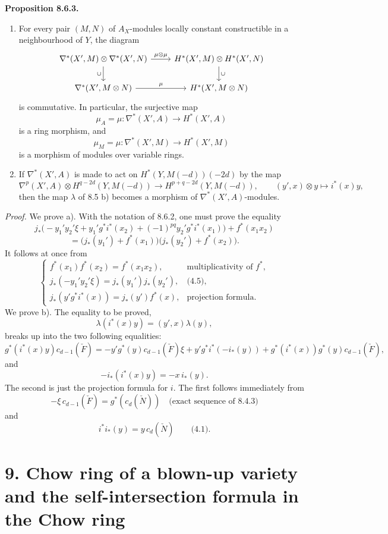 \documentclass[11pt]{article}
\newenvironment{statement}[1]{\par\medskip\noindent\textbf{#1.}\ }{\par\medskip}
\begin{document}
\begin{statement}{Proposition 8.6.3}
\begin{enumerate}[label=\alph*)]
\item For every pair $(M,N)$ of $A_X$-modules locally constant constructible in a neighbourhood of $Y$, the diagram
\[
\begin{tikzcd}
\nabla^*(X',M)\otimes\nabla^*(X',N)\arrow[r,"\mu\otimes\mu"]\arrow[d,"\cup"']&
H^*(X',M)\otimes H^*(X',N)\arrow[d,"\cup"]\\
\nabla^*(X',M\otimes N)\arrow[r,"\mu"]&
H^*(X',M\otimes N)
\end{tikzcd}
\]
is commutative. In particular, the surjective map
\[
\mu_A=\mu:\nabla^*(X',A)\to H^*(X',A)
\]
is a ring morphism, and
\[
\mu_M=\mu:\nabla^*(X',M)\to H^*(X',M)
\]
is a morphism of modules over variable rings.
\item If $\nabla^*(X',A)$ is made to act on $H^*(Y,M(-d))(-2d)$ by the map
\[
\nabla^p(X',A)\otimes H^{q-2d}(Y,M(-d))
\to H^{p+q-2d}(Y,M(-d)),
\qquad
(y',x)\otimes y\mapsto i^*(x)y,
\]
then the map $\lambda$ of 8.5 b) becomes a morphism of $\nabla^*(X',A)$-modules.
\end{enumerate}
\end{statement}

\emph{Proof.} We prove a). With the notation of 8.6.2, one must prove the equality
\[
j_*\bigl(-y_1'y_2'\xi+y_1'g^*i^*(x_2)+(-1)^{pq}y_2'g^*i^*(x_1)\bigr)+f^*(x_1x_2)
\]
\[
=\bigl(j_*(y_1')+f^*(x_1)\bigr)\bigl(j_*(y_2')+f^*(x_2)\bigr).
\]
It follows at once from
\[
\begin{cases}
f^*(x_1)f^*(x_2)=f^*(x_1x_2),&\text{multiplicativity of }f^*,\\
j_*(-y_1'y_2'\xi)=j_*(y_1')j_*(y_2'),&\text{(4.5)},\\
j_*(y'g^*i^*(x))=j_*(y')f^*(x),&\text{projection formula}.
\end{cases}
\]
We prove b). The equality to be proved,
\[
\lambda(i^*(x)y)=(y',x)\lambda(y),
\]
breaks up into the two following equalities:
\[
g^*(i^*(x)y)c_{d-1}(\check F)
=
-y'g^*(y)c_{d-1}(\check F)\xi
+y'g^*i^*(-i_*(y))
+g^*(i^*(x))g^*(y)c_{d-1}(\check F),
\]
and
\[
-i_*(i^*(x)y)=-x\,i_*(y).
\]
The second is just the projection formula for $i$. The first follows immediately from
\[
-\xi\,c_{d-1}(\check F)=g^*(c_d(\check N))
\quad\text{(exact sequence of 8.4.3)}
\]
and
\[
i^*i_*(y)=y\,c_d(\check N)\qquad\text{(4.1)}.
\]

\section*{9. Chow ring of a blown-up variety and the self-intersection formula in the Chow ring}
\end{document}
